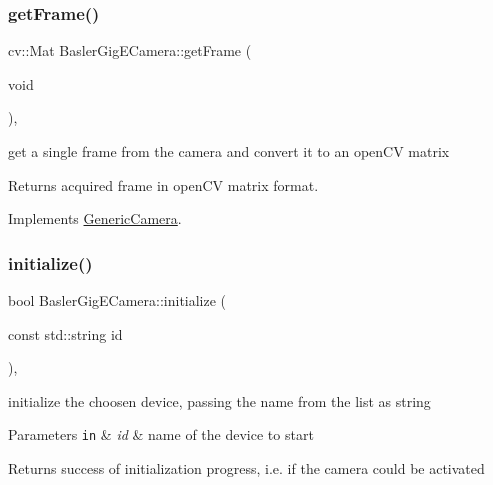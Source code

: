 \mbox{\label{class_basler_gig_e_camera_a8e2789aa27a9b0a8075457223afa415e}} 
\subsubsection{\texorpdfstring{get\+Frame()}{getFrame()}}
{\footnotesize\ttfamily cv\+::\+Mat Basler\+Gig\+E\+Camera\+::get\+Frame (\begin{DoxyParamCaption}\item[{void}]{ }\end{DoxyParamCaption})\hspace{0.3cm}{\ttfamily [override]}, {\ttfamily [virtual]}}

get a single frame from the camera and convert it to an open\+CV matrix \begin{DoxyReturn}{Returns}
acquired frame in open\+CV matrix format. 
\end{DoxyReturn}


Implements \hyperlink{class_generic_camera_abeaa74ba34179da70ec2c4bbb9b0d793}{Generic\+Camera}.

\mbox{\label{class_basler_gig_e_camera_a1690e409075c423eec92a039781989df}} 
\subsubsection{\texorpdfstring{initialize()}{initialize()}}
{\footnotesize\ttfamily bool Basler\+Gig\+E\+Camera\+::initialize (\begin{DoxyParamCaption}\item[{const std\+::string}]{id }\end{DoxyParamCaption})\hspace{0.3cm}{\ttfamily [override]}, {\ttfamily [virtual]}}

initialize the choosen device, passing the name from the list as string 
\begin{DoxyParams}[1]{Parameters}
\mbox{\tt in}  & {\em id} & name of the device to start \\
\hline
\end{DoxyParams}
\begin{DoxyReturn}{Returns}
success of initialization progress, i.\+e. if the camera could be activated 
\end{DoxyReturn}


